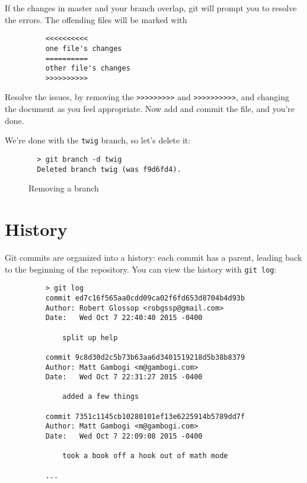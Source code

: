 \documentclass[11pt]{report}
\begin{document}
If the changes in master and your branch overlap, git will prompt you
to resolve the errors. The offending files will be marked with

\begin{figure}[H]
  \begin{lstlisting}
    <<<<<<<<<<
    one file's changes
    ==========
    other file's changes
    >>>>>>>>>>
  \end{lstlisting}
\end{figure}

Resolve the issues, by removing the \texttt{>>>>>>>>>}
and \texttt{>>>>>>>>>>}, and changing the document as you feel appropriate.
Now add and commit the file, and you're done.

We're done with the \texttt{twig} branch, so let's delete it:
\begin{figure}[H]
  \caption{Removing a branch}
  \begin{lstlisting}
  > git branch -d twig
  Deleted branch twig (was f9d6fd4).
  \end{lstlisting}
\end{figure}

\section{History}

Git commits are organized into a history: each commit has a parent,
leading back to the beginning of the repository. You can view the
history with \texttt{git log}:

\begin{figure}[H]
  \begin{lstlisting}
    > git log
    commit ed7c16f565aa0cdd09ca02f6fd653d8704b4d93b
    Author: Robert Glossop <robgssp@gmail.com>
    Date:   Wed Oct 7 22:40:40 2015 -0400
    
        split up help
    
    commit 9c8d30d2c5b73b63aa6d3401519218d5b38b8379
    Author: Matt Gambogi <m@gambogi.com>
    Date:   Wed Oct 7 22:31:27 2015 -0400
    
        added a few things
    
    commit 7351c1145cb10280101ef13e6225914b5789dd7f
    Author: Matt Gambogi <m@gambogi.com>
    Date:   Wed Oct 7 22:09:08 2015 -0400
    
        took a book off a hook out of math mode

    ...
  \end{lstlisting}
\end{figure}
\end{document}
